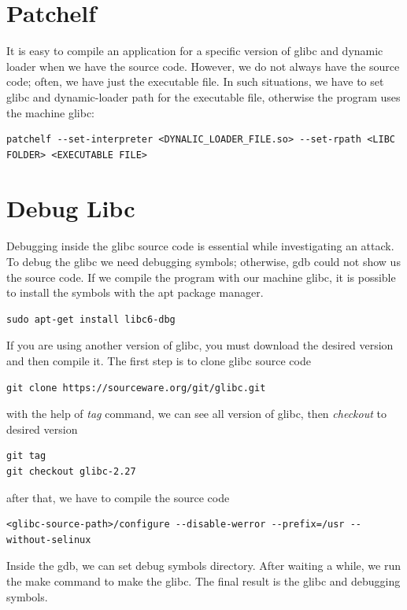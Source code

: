 \documentclass{masterthesis}
\newcommand*\libc{glibc}
\begin{document}
\section{Patchelf}
\label{sect:Patchelf}
It is easy to compile an application for a specific version of \libc{} and dynamic loader when we have the source code. However, we do not always have the source code; often, we have just the executable file. In such situations, we have to set \libc{} and dynamic-loader path for the executable file, otherwise the program uses the machine \libc{}:
\begin{lstlisting}[frame=tlrb]
patchelf --set-interpreter <DYNALIC_LOADER_FILE.so> --set-rpath <LIBC FOLDER> <EXECUTABLE FILE>
\end{lstlisting}

\section{Debug Libc}
\label{sect:DebugLibc}

Debugging inside the \libc{} source code is essential while investigating an attack. To debug the \libc{} we need debugging symbols; otherwise, gdb could not show us the source code. If we compile the program with our machine \libc{}, it is possible to install the symbols with the apt package manager.
\begin{lstlisting}[frame=tlrb]
sudo apt-get install libc6-dbg
\end{lstlisting}

If you are using another version of \libc{}, you must download the desired version and then compile it. The first step is to clone \libc{} source code
\begin{lstlisting}[frame=tlrb]
git clone https://sourceware.org/git/glibc.git
\end{lstlisting}
with the help of \emph{tag} command, we can see all version of \libc{}, then \emph{checkout} to desired version
\begin{lstlisting}[frame=tlrb]
git tag
git checkout glibc-2.27
\end{lstlisting}
after that, we have to compile the source code
\begin{lstlisting}[frame=tlrb]
<glibc-source-path>/configure --disable-werror --prefix=/usr --without-selinux
\end{lstlisting}
Inside the gdb, we can set debug symbols directory. After waiting a while, we run the make command to make the \libc{}. The final result is the \libc{} and debugging symbols.
\end{document}
